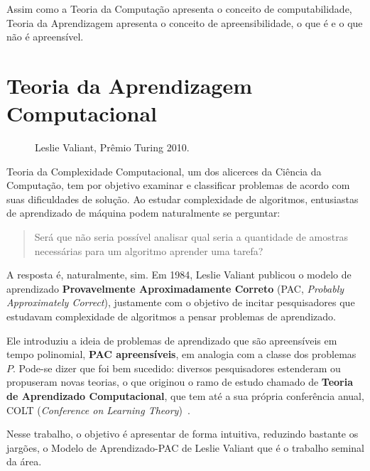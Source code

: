 \documentclass[
10pt, %
a4paper, %
onecolumn, %
]{article}
\begin{document}
Assim como a Teoria da Computação apresenta o conceito de computabilidade, Teoria da Aprendizagem apresenta o conceito de apreensibilidade, o que é e o que não é apreensível. 


\section{Teoria da Aprendizagem Computacional} 

\begin{figure}
    \caption{Leslie Valiant, Prêmio Turing 2010.}
    \label{leslie}
\end{figure}

Teoria da Complexidade Computacional, um dos alicerces da Ciência da Computação, tem por objetivo examinar e classificar problemas de acordo com suas dificuldades de solução. Ao estudar complexidade de algoritmos, entusiastas de aprendizado de máquina podem naturalmente se perguntar: \begin{quotation}Será que não seria possível analisar qual seria a quantidade de amostras necessárias para um algoritmo aprender uma tarefa?\end{quotation}
    
A resposta é, naturalmente, sim. Em 1984, Leslie Valiant publicou o modelo de aprendizado \textbf{Provavelmente Aproximadamente Correto} (PAC, \emph{Probably Approximately Correct})\cite{Valiant1984}, justamente com o objetivo de incitar pesquisadores que estudavam complexidade de algoritmos a pensar problemas de aprendizado. 

Ele introduziu a ideia de problemas de aprendizado que são apreensíveis em tempo polinomial, \textbf{PAC apreensíveis}, em analogia com a classe dos problemas $P$. Pode-se dizer que foi bem sucedido:  diversos pesquisadores estenderam ou propuseram novas teorias, o que originou o ramo de estudo chamado de \textbf{Teoria de Aprendizado Computacional}, que tem até a sua própria conferência anual, COLT (\emph{Conference on Learning Theory})~\cite{COLT}.

Nesse trabalho, o objetivo é apresentar de forma intuitiva, reduzindo bastante os jargões, o Modelo de Aprendizado-PAC de Leslie Valiant que é o trabalho seminal da área. 
\end{document}
